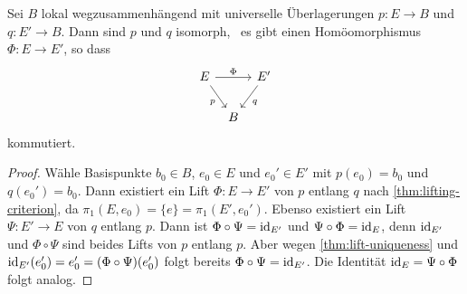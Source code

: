 \begin{corollary}
Sei $B$ lokal wegzusammenhängend mit universelle Überlagerungen $p\colon E\to B$ und $q\colon E'\to B$. Dann sind $p$ und $q$ isomorph, \ddh~es gibt einen Homöomorphismus $\Phi\colon E\to E'$, so dass
\[
\begin{tikzcd}[column sep=tiny]
E \ar[rr, "\Phi"]\ar[rd,"p"'] & & E'\ar[dl, "q"] \\
& B
\end{tikzcd}
\]
kommutiert.
\end{corollary}
\begin{proof}
Wähle Basispunkte $b_0\in B$, $e_0\in E$ und $e_0'\in E'$ mit $p(e_0) = b_0$ und $q(e_0') = b_0$. Dann existiert ein Lift $\Phi\colon E\to E'$ von $p$ entlang $q$ nach \autoref{thm:lifting-criterion}, da $\pi_1(E,e_0) = \{e\} = \pi_1(E',e_0')$. Ebenso existiert ein Lift $\Psi\colon E'\to E$ von $q$ entlang $p$. Dann ist $\Phi\circ\Psi = \operatorname{\textnormal{id}}_{E'}$ und $\Psi\circ\Phi = \operatorname{\textnormal{id}}_E$, denn $\operatorname{\textnormal{id}}_{E'}$ und $\Phi\circ\Psi$ sind beides Lifts von $p$ entlang $p$.  Aber wegen \autoref{thm:lift-uniqueness} und $\operatorname{\textnormal{id}}_{E'}(e_0') = e_0' = (\Phi\circ\Psi)(e_0')$ folgt bereits $\Phi\circ\Psi = \operatorname{\textnormal{id}}_{E'}$. Die Identität $\operatorname{\textnormal{id}}_E = \Psi\circ\Phi$ folgt analog.
\end{proof}

